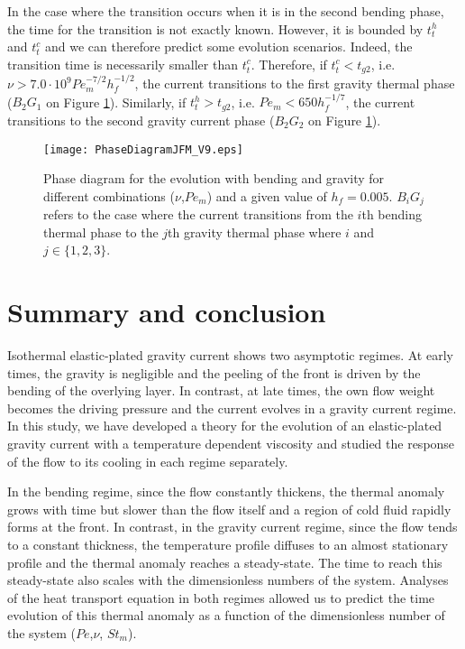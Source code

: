 In  the case  where the  transition occurs  when it  is in  the second
bending  phase, the  time for  the  transition is  not exactly  known.
However, it  is bounded by  $t_t^h$ and  $t_t^c$ and we  can therefore
predict  some evolution  scenarios.   Indeed, the  transition time  is
necessarily smaller than $t_t^c$.   Therefore, if $t_t^c<t_{g2}$, i.e.
$\nu>7.0\cdot 10^9Pe_m^{-7/2} h_f^{-1/2}$,  the current transitions to
the    first   gravity    thermal    phase    ($B_2G_1$   on    Figure
\ref{C3-Phase_Diagram_ELASGRAV}).  Similarly,  if $t_t^h>t_{g2}$, i.e.
$Pe_m<650h_f^{-1/7}$, the  current transitions  to the  second gravity
current phase ($B_2G_2$ on Figure \ref{C3-Phase_Diagram_ELASGRAV}).

\begin{figure}
  \begin{center}
    \graphicspath{ {/Users/thorey/Documents/These/Projet/Refroidissement/Skin_Model/Figure/JFM_V13/} }
    \texttt{[image: PhaseDiagramJFM\_V9.eps]}
    \caption{Phase diagram for the  evolution with bending and gravity
      for different  combinations ($\nu$,$Pe_m$) and a  given value of
      $h_f =  0.005$.  $B_iG_j$ refers  to the case where  the current
      transitions from  the $i$th bending  thermal phase to  the $j$th
      gravity thermal phase where $i$ and $j \in \{1,2,3\}$.}
    \label{C3-Phase_Diagram_ELASGRAV}
  \end{center}
\end{figure}
\section{Summary and conclusion}
\label{C3-sec:conclusion}

Isothermal  elastic-plated   gravity  current  shows   two  asymptotic
regimes.  At early times, the gravity is negligible and the peeling of
the  front is  driven  by  the bending  of  the  overlying layer.   In
contrast,  at late  times, the  own  flow weight  becomes the  driving
pressure and the current evolves in a gravity current regime.  In this
study,  we   have  developed  a   theory  for  the  evolution   of  an
elastic-plated gravity current with  a temperature dependent viscosity
and studied  the response of  the flow to  its cooling in  each regime
separately.

In the bending regime, since the flow constantly thickens, the thermal
anomaly grows with  time but slower than the flow  itself and a region
of cold fluid rapidly forms at  the front. In contrast, in the gravity
current  regime, since  the flow  tends to  a constant  thickness, the
temperature profile diffuses  to an almost stationary  profile and the
thermal  anomaly  reaches a  steady-state.   The  time to  reach  this
steady-state also scales with the dimensionless numbers of the system.
Analyses of the heat transport equation  in both regimes allowed us to
predict the  time evolution of this  thermal anomaly as a  function of
the dimensionless number of the system ($Pe$,$\nu$, $St_m$).

